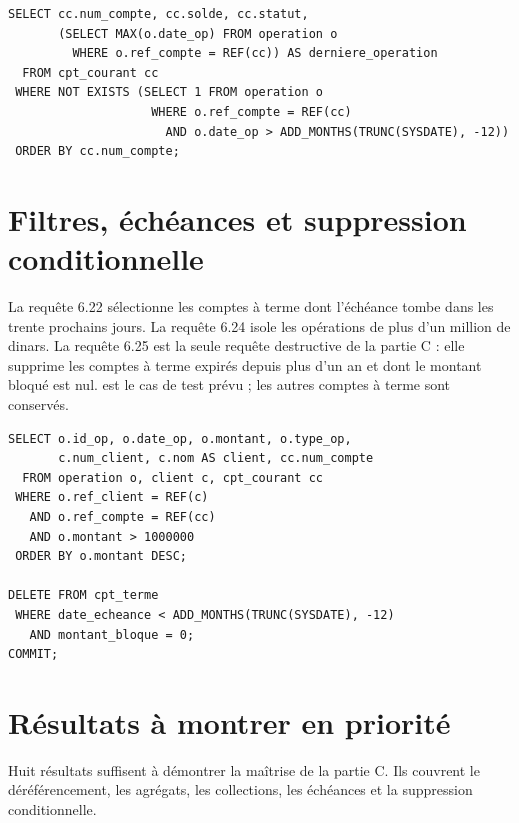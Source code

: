 \begin{lstlisting}[caption={Comptes courants sans opération depuis douze mois.},label={lst:not-exists}]
SELECT cc.num_compte, cc.solde, cc.statut,
       (SELECT MAX(o.date_op) FROM operation o
         WHERE o.ref_compte = REF(cc)) AS derniere_operation
  FROM cpt_courant cc
 WHERE NOT EXISTS (SELECT 1 FROM operation o
                    WHERE o.ref_compte = REF(cc)
                      AND o.date_op > ADD_MONTHS(TRUNC(SYSDATE), -12))
 ORDER BY cc.num_compte;
\end{lstlisting}

\section{Filtres, échéances et suppression conditionnelle}

La requête 6.22 sélectionne les comptes à terme dont l'échéance tombe dans les
trente prochains jours. La requête 6.24 isole les opérations de plus d'un
million de dinars. La requête 6.25 est la seule requête destructive de la
partie C : elle supprime les comptes à terme expirés depuis plus d'un an et
dont le montant bloqué est nul.  est le cas de test prévu ; les
autres comptes à terme sont conservés.

\begin{lstlisting}[caption={Opérations de plus d'un million et suppression des comptes à terme expirés.},label={lst:filtres-suppression}]
SELECT o.id_op, o.date_op, o.montant, o.type_op,
       c.num_client, c.nom AS client, cc.num_compte
  FROM operation o, client c, cpt_courant cc
 WHERE o.ref_client = REF(c)
   AND o.ref_compte = REF(cc)
   AND o.montant > 1000000
 ORDER BY o.montant DESC;

DELETE FROM cpt_terme
 WHERE date_echeance < ADD_MONTHS(TRUNC(SYSDATE), -12)
   AND montant_bloque = 0;
COMMIT;
\end{lstlisting}

\section{Résultats à montrer en priorité}

Huit résultats suffisent à démontrer la maîtrise de la partie C. Ils couvrent
le déréférencement, les agrégats, les collections, les échéances et la
suppression conditionnelle.

